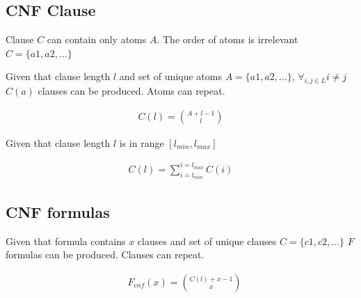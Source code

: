 %
%

\subsection{CNF Clause}

Clause $C$ can contain only atoms $A$. The order of atoms is irrelevant $C = \{a1, a2, \dots\}$

Given that 
clause length $l$ and 
set of unique atoms $A = \{a1, a2, \dots\}$, $\forall_{i,j \in L} i \neq j$
$C(a)$ clauses can be produced. Atoms can repeat.

\begin{align}
  C(l) = \binom{A + l - 1}{l}
\end{align}

Given that clause length $l$ is in range $[l_{min}, l_{max}]$

\begin{align}
  C(l) = \sum_{i=l_{min}}^{i=l_{max}} C(i) \label{eq:clause}
\end{align}

\subsection{CNF formulas}

Given that
formula contains $x$ clauses and
set of unique clauses $C = \{c1,c2, \dots\}$
$F$ formulas can be produced. Clauses can repeat.

\begin{align}
  &F_{cnf}(x) = \binom{C(l) + x - 1}{x} \label{eq:cnfformula}
\end{align}
